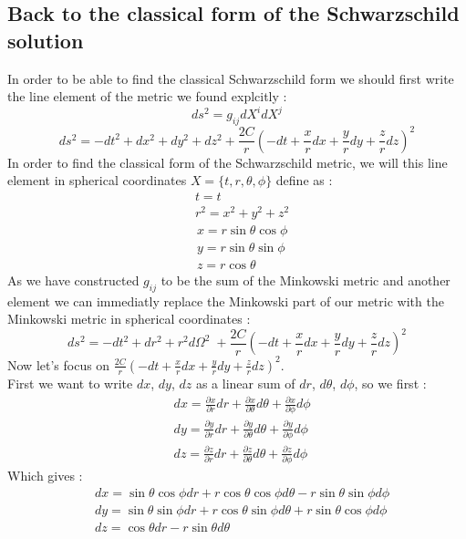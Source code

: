 \documentclass[a4paper,12pt]{article}
\theoremstyle{definition}
\begin{document}
\subsection{Back to the classical form of the Schwarzschild solution}
In order to be able to find the classical Schwarzschild form we should first write the line element of the metric we found explcitly :
\begin{equation*}
	ds^2=g_{ij}dX^idX^j
\end{equation*}
\begin{equation}
	ds^2=-dt^2+dx^2+dy^2+dz^2+\frac{2C}{r}(-dt+\frac{x}{r}dx+\frac{y}{r}dy+\frac{z}{r}dz)^2
\end{equation}
In order to find the classical form of the Schwarzschild metric, we will this line element in spherical coordinates $X=\{t,r,\theta,\phi\}$ define as :
\begin{align*}
	&t=t\\
	&r^2=x^2+y^2+z^2
\end{align*}
\begin{align}
	&x=r\sin{\theta}\cos{\phi}\label{coord-transform-1}\\
	&y=r\sin{\theta}\sin{\phi}\\
	&z=r\cos{\theta}\label{coord-transform-3}
\end{align}
As we have constructed $g_{ij}$ to be the sum of the Minkowski metric and another element we can immediatly replace the Minkowski part of our metric with the Minkowski metric in spherical coordinates :
\begin{equation} \label{line-elem-schwarz}
	ds^2=-dt^2+dr^2+r^2d\Omega^2\;+\frac{2C}{r}(-dt+\frac{x}{r}dx+\frac{y}{r}dy+\frac{z}{r}dz)^2
\end{equation} 
Now let's focus on $\frac{2C}{r}(-dt+\frac{x}{r}dx+\frac{y}{r}dy+\frac{z}{r}dz)^2$.\\
First we want to write $dx$, $dy$, $dz$ as a linear sum of $dr$, $d\theta$, $d\phi$, so we first :
\begin{align*}
	&dx=\frac{\partial x}{\partial r}dr+\frac{\partial x}{\partial \theta}d\theta+\frac{\partial x}{\partial \phi}d\phi\\
	&dy=\frac{\partial y}{\partial r}dr+\frac{\partial y}{\partial \theta}d\theta+\frac{\partial y}{\partial \phi}d\phi\\
	&dz=\frac{\partial z}{\partial r}dr+\frac{\partial z}{\partial \theta}d\theta+\frac{\partial z}{\partial \phi}d\phi
\end{align*}
Which gives :
\begin{align}
	&dx=\sin{\theta}\cos{\phi}dr+r\cos{\theta}\cos{\phi}d\theta-r\sin{\theta}\sin{\phi}d\phi \\
	&dy=\sin{\theta}\sin{\phi}dr+r\cos{\theta}\sin{\phi}d\theta+r\sin{\theta}\cos{\phi}d\phi \\
	&dz=\cos{\theta}dr-r\sin{\theta}d\theta
\end{align}
\end{document}
